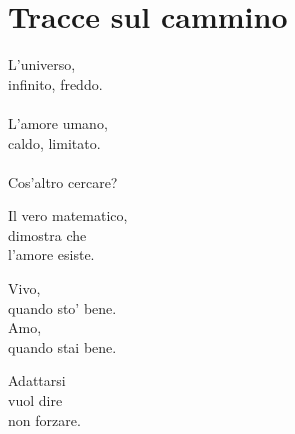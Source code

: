 \chapter{Tracce sul cammino}

\begin{haiku}
L'universo,\\
infinito, freddo.\\
\leavevmode\\
L'amore umano,\\
caldo, limitato.\\
\leavevmode\\
Cos'altro cercare?\\
\end{haiku}

\begin{haiku}
    Il vero matematico,\\
    dimostra che\\
    l'amore esiste.\\
\end{haiku}

\begin{haiku}
    Vivo,\\
    quando sto' bene.\\
    Amo,\\
    quando stai bene.\\
\end{haiku}

\begin{haiku}
Adattarsi \\
vuol dire\\
non forzare.\\
\end{haiku}

